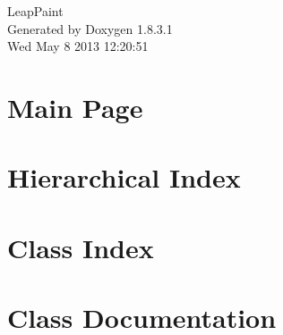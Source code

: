 \documentclass{book}
\begin{document}
\hypersetup{pageanchor=false,citecolor=blue}
\begin{titlepage}
\vspace*{7cm}
\begin{center}
{\Large Leap\-Paint }\\
\vspace*{1cm}
{\large Generated by Doxygen 1.8.3.1}\\
\vspace*{0.5cm}
{\small Wed May 8 2013 12:20:51}\\
\end{center}
\end{titlepage}
\clearemptydoublepage
{}
\tableofcontents
\clearemptydoublepage
{}
\hypersetup{pageanchor=true,citecolor=blue}
\chapter{Main Page}
\label{index}\hypertarget{index}{}
\chapter{Hierarchical Index}

\chapter{Class Index}

\chapter{Class Documentation}





























\printindex
\end{document}
